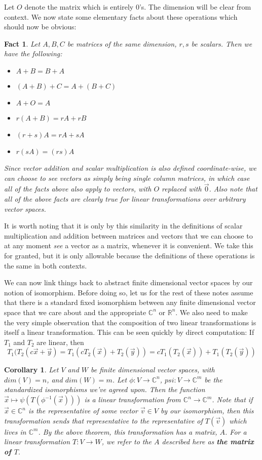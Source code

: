 \documentclass{article}
\theoremstyle{definition}
\theoremstyle{plain}
\theoremstyle{theorem}
\newtheorem{fact}{Fact}[section]
\newtheorem{corollary}{Corollary}[section]
\begin{document}
Let $O$ denote the matrix which is entirely $0$'s. The dimension will be clear from context. We now state some elementary facts about these operations which should now be obvious:
\begin{fact}
	Let $A,B,C$ be matrices of the same dimension, $r,s$ be scalars. Then we have the following:
	\begin{itemize}
		\item[(a)] $A+B=B+A$
		\item[(b)] $(A+B)+C = A+(B+C)$
		\item[(c)] $A+O = A$
		\item[(d)] $r(A+B) = rA+rB$
		\item[(e)] $(r+s)A = rA+sA$
		\item[(f)] $r(sA) = (rs)A$
	\end{itemize}
	Since vector addition and scalar multiplication is \textit{also} defined coordinate-wise, we can choose to see vectors as simply being single column matrices, in which case all of the facts above also apply to vectors, with $O$ replaced with $\vec{0}$. Also note that all of the above facts are clearly true for linear transformations over \textit{arbitrary} vector spaces.  
\end{fact}
It is worth noting that it is only by this similarity in the definitions of scalar multiplication and addition between matrices and vectors that we can choose to at any moment \textit{see} a vector as a matrix, whenever it is convenient. We take this for granted, but it is only allowable because the definitions of these operations is the same in both contexts. 
\par We can now link things back to abstract finite dimensional vector spaces by our notion of isomorphism. Before doing so, let us for the rest of these notes assume that there is a standard fixed isomorphism between any finite dimensional vector space that we care about and the appropriate $\mathbb{C}^n$ or $\mathbb{R}^n$. We also need to make the very simple observation that the composition of two linear transformations is itself a linear transformation. This can be seen quickly by direct computation: If $T_1$ and $T_2$ are linear, then
\[T_1(T_2(c\vec{x}+\vec{y}) = T_1(cT_2(\vec{x})+T_2(\vec{y})) = cT_1(T_2(\vec{x}))+T_1(T_2(\vec{y})) \]
\begin{corollary}
	Let $V$ and $W$ be finite dimensional vector spaces, with $dim(V) = n$, and $dim(W) = m$. Let $\phi:V \to \mathbb{C}^n$, $psi: V \to \mathbb{C}^m$ be the standardized isomorphisms we've agreed upon. Then the function $\vec{x} \mapsto \psi(T(\phi^{-1}(\vec{x})))$ is a linear transformation from $\mathbb{C}^n \to \mathbb{C}^m$. Note that if $\vec{x} \in \mathbb{C}^n$ is the representative of some vector $\vec{v} \in V$ by our isomorphism, then this transformation sends that representative to the representative of $T(\vec{v})$ which lives in $\mathbb{C}^m$. By the above theorem, this transformation has a matrix, $A$. For a linear transformation $T:V \to W$, we refer to the $A$ described here as \textbf{the matrix of $T$}. 
\end{corollary}
\end{document}
